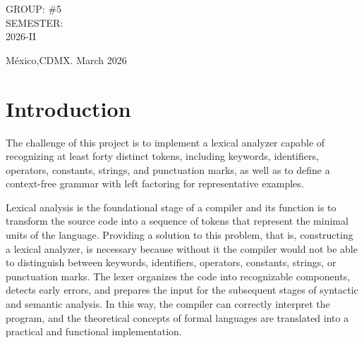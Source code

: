 \documentclass[letterpaper,12pt,oneside]{article}
\begin{document}
\begin{titlepage}
\begin{center}
\begin{center}
\begin{center}
				\end{center}
				
				\bigskip
				
				GROUP: \#5\\
				SEMESTER: \\
                2026-II
			\end{center}
			
			\vfill
			
			\begin{center}
				{México,CDMX. March 2026}\\
			\end{center}
			\cleardoublepage
		\end{center}
	\end{titlepage}
 
\tableofcontents
\clearpage
    

\section{Introduction} %
The challenge of this project is to implement a lexical analyzer capable of recognizing at least forty distinct tokens, including keywords, identifiers, operators, constants, strings, and punctuation marks, as well as to define a context-free grammar with left factoring for representative examples. 

Lexical analysis is the foundational stage of a compiler and its function is to transform the source code into a sequence of tokens that represent the minimal units of the language.
Providing a solution to this problem, that is, constructing a lexical analyzer, is necessary because without it the compiler would not be able to distinguish between keywords, identifiers, operators, constants, strings, or punctuation marks. The lexer organizes the code into recognizable components, detects early errors, and prepares the input for the subsequent stages of syntactic and semantic analysis. In this way, the compiler can correctly interpret the program, and the theoretical concepts of formal languages are translated into a practical and functional implementation.
\end{document}
